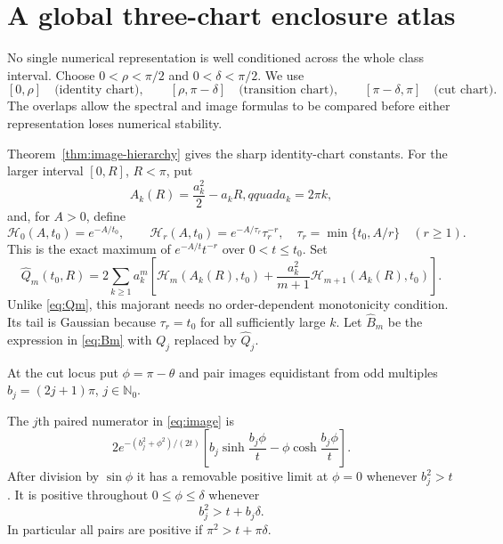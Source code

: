 \section{A global three-chart enclosure atlas}\label{sec:endpoints}

No single numerical representation is well conditioned across the whole
class interval.  Choose $0<\rho<\pi/2$ and $0<\delta<\pi/2$.  We use
\[
 [0,\rho]\quad\text{(identity chart)},\qquad
 [\rho,\pi-\delta]\quad\text{(transition chart)},\qquad
 [\pi-\delta,\pi]\quad\text{(cut chart)}.
\]
The overlaps allow the spectral and image formulas to be compared before
either representation loses numerical stability.

Theorem~\ref{thm:image-hierarchy} gives the sharp identity-chart constants.
For the larger interval $[0,R]$, $R<\pi$, put
\[
 A_k(R)=\frac{a_k^2}{2}-a_kR,qquad a_k=2\pi k,
\]
and, for $A>0$, define
\begin{equation}\label{eq:Hmax}
 \mathcal H_0(A,t_0)=e^{-A/t_0},\qquad
 \mathcal H_r(A,t_0)=e^{-A/\tau_r}\tau_r^{-r},\quad
 \tau_r=\min\{t_0,A/r\}\quad(r\ge1).
\end{equation}
This is the exact maximum of $e^{-A/t}t^{-r}$ over $0<t\le t_0$.
Set
\begin{equation}\label{eq:Qhat}
 \widehat Q_m(t_0,R)=2\sum_{k\ge1}a_k^m
 \left[\mathcal H_m(A_k(R),t_0)
 +\frac{a_k^2}{m+1}\mathcal H_{m+1}(A_k(R),t_0)\right].
\end{equation}
Unlike \eqref{eq:Qm}, this majorant needs no order-dependent monotonicity
condition.  Its tail is Gaussian because $\tau_r=t_0$ for all sufficiently
large $k$.  Let $\widehat B_m$ be the expression in \eqref{eq:Bm} with
$Q_j$ replaced by $\widehat Q_j$.

At the cut locus put $\phi=\pi-\theta$ and pair images equidistant from odd
multiples $b_j=(2j+1)\pi$, $j\in\mathbb N_0$.

\begin{proposition}\label{prop:cut-pair}
The $j$th paired numerator in \eqref{eq:image} is
\begin{equation}\label{eq:cutpair}
2e^{-(b_j^2+\phi^2)/(2t)}
\left[b_j\sinh\frac{b_j\phi}{t}
-\phi\cosh\frac{b_j\phi}{t}\right].
\end{equation}
After division by $\sin\phi$ it has a removable positive limit at $\phi=0$
whenever $b_j^2>t$.  It is positive throughout $0\le\phi\le\delta$ whenever
\begin{equation}\label{eq:cutcondition}
 b_j^2>t+b_j\delta.
\end{equation}
In particular all pairs are positive if $\pi^2>t+\pi\delta$.
\end{proposition}

